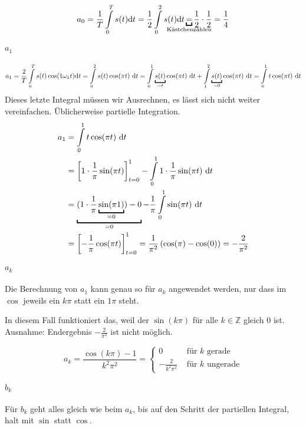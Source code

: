 \[
	a_0 = \frac{1}{T} \int\limits^T_0 s(t) \mathrm{d}t = \frac{1}{2} \int\limits^2_0 s(t) \mathrm{d}t \underbracket{=}_{\mathclap{\text{Kästchenzählen}}} \frac{1}{2} \cdot \frac{1}{2} = \frac{1}{4}
\]

\paragraph{$a_1$}

\[
	a_1 = \frac{2}{T} \int\limits^T_0 s(t) \cos(1 \omega_1 t) \mathrm{d}t
	 = \int\limits^2_0 s(t) \cos(\pi t) \dt
	 = \int\limits^1_0 \underbracket{s(t)}_{=t} \cos(\pi t) \dt + \int\limits^2_1 \underbracket{s(t)}_{=0} \cos(\pi t) \dt
	 = \int\limits^1_0 t \cos (\pi t) \dt
\]
Dieses letzte Integral müssen wir Ausrechnen, es lässt sich nicht weiter vereinfachen. Üblicherweise partielle Integration.
\begin{align}
	a_1 &= \int\limits^1_0 t \cos(\pi t) \dt \\
		&= \left[ 1 \cdot \frac{1}{\pi} \sin(\pi t) \right]^1_{t=0} - \int\limits^1_0 1 \cdot \frac{1}{\pi} \sin( \pi t) \dt \\
		&= \underbracket{(1 \cdot \frac{1}{\pi} \underbracket{\sin(\pi 1)}_{=0}) - 0}_{=0} - \frac{1}{\pi} \int\limits^1_0 \sin( \pi t) \dt \\
		&= \left[ - \frac{1}{\pi} \cos(\pi t) \right]^1_{t=0}  = \frac{1}{\pi^2} \left( \cos(\pi) - \cos(0)\right) = - \frac{2}{\pi^2}
\end{align}

\paragraph{$a_k$}

Die Berechnung von $a_1$ kann genau so für $a_k$ angewendet werden, nur dass im $\cos$ jeweils ein $k \pi$ statt ein $1 \pi$ steht.

In diesem Fall funktioniert das, weil der $\sin(k\pi)$ für alle $k \in \mathbb{Z}$ gleich $0$ ist. Ausnahme: Endergebnis $- \frac{2}{\pi^2}$ ist nicht möglich.

\[
	a_k = \frac{\cos(k \pi) -1}{k^2 \pi^2} = \begin{cases}
		0 & \text{ für } k \text{ gerade} \\
		- \frac{2}{k^2 \pi^2} & \text{ für } k \text{ ungerade}
	\end{cases}
\]


\paragraph{$b_k$} Für $b_k$ geht alles gleich wie beim $a_k$, bis auf den Schritt der partiellen Integral, halt mit $\sin$ statt $\cos$.

